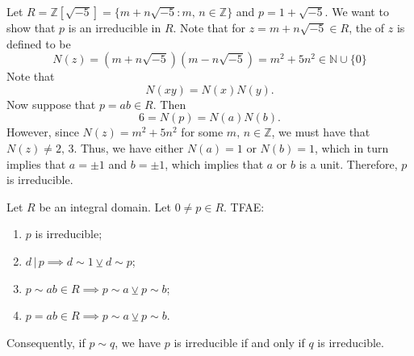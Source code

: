 \begin{eg}\label{eg:irreducible_eg}
  Let $R = \mathbb{Z}[\sqrt{-5}] = \{ m + n \sqrt{-5} : m, \, n \in \mathbb{Z} \}$ and $p = 1 + \sqrt{-5}$. We want to show that $p$ is an irreducible in $R$. Note that for $z = m + n \sqrt{-5} \in R$, the  of $z$ is defined to be
  \begin{equation*}
    N(z) = \left(m + n \sqrt{-5}\right)\left(m - n \sqrt{-5}\right) = m^2 + 5n^2 \in \mathbb{N} \cup \{0\}
  \end{equation*}
  Note that
  \begin{equation*}
    N(xy) = N(x) N(y).
  \end{equation*}
  Now suppose that $p = ab \in R$. Then
  \begin{equation*}
    6 = N(p) = N(a)N(b).
  \end{equation*}
  However, since $N(z) = m^2 + 5n^2$ for some $m, \, n \in \mathbb{Z}$, we must have that $N(z) \neq 2, \, 3$. Thus, we have either $N(a) = 1$ or $N(b) = 1$, which in turn implies that $a = \pm 1$ and $b = \pm 1$, which implies that $a$ or $b$ is a unit. Therefore, $p$ is irreducible.
\end{eg}

\begin{propo}
\label{propo:properties_of_irreducibles}
  Let $R$ be an integral domain. Let $0 \neq p \in R$. TFAE:
  \begin{enumerate}
    \item $p$ is irreducible;
    \item $d \, | \, p \implies d \sim 1 \veebar d \sim p$;
    \item $p \sim ab \in R \implies p \sim a \veebar p \sim b$;
    \item $p = ab \in R \implies p \sim a \veebar p \sim b$.
  \end{enumerate}
  Consequently, if $p \sim q$, we have $p$ is irreducible if and only if $q$ is irreducible.
\end{propo}

